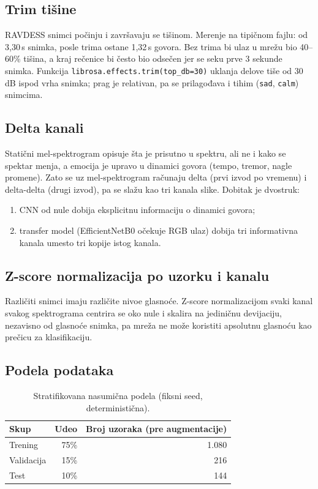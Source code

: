 \documentclass[12pt,a4paper]{article}
\begin{document}
\subsection{Trim tišine}

RAVDESS snimci počinju i završavaju se tišinom. Merenje na tipičnom fajlu:
od 3,30\,s snimka, posle trima ostane 1,32\,s govora. Bez trima bi ulaz u
mrežu bio 40--60\% tišina, a kraj rečenice bi često bio odsečen jer se seku
prve 3 sekunde snimka. Funkcija \texttt{librosa.effects.trim(top\_db=30)}
uklanja delove tiše od 30\,dB ispod vrha snimka; prag je relativan, pa se
prilagođava i tihim (\texttt{sad}, \texttt{calm}) snimcima.

\subsection{Delta kanali}

Statični mel-spektrogram opisuje šta je prisutno u spektru, ali ne i kako
se spektar menja, a emocija je upravo u dinamici govora (tempo, tremor,
nagle promene). Zato se uz mel-spektrogram računaju delta (prvi izvod po
vremenu) i delta-delta (drugi izvod), pa se slažu kao tri kanala slike.
Dobitak je dvostruk:
\begin{enumerate}
  \item CNN od nule dobija eksplicitnu informaciju o dinamici govora;
  \item transfer model (EfficientNetB0 očekuje RGB ulaz) dobija tri
        informativna kanala umesto tri kopije istog kanala.
\end{enumerate}

\subsection{Z-score normalizacija po uzorku i kanalu}

Različiti snimci imaju različite nivoe glasnoće. Z-score normalizacijom
svaki kanal svakog spektrograma centrira se oko nule i skalira na jediničnu
devijaciju, nezavisno od glasnoće snimka, pa mreža ne može koristiti
apsolutnu glasnoću kao prečicu za klasifikaciju.

\subsection{Podela podataka}

\begin{table}[H]
\centering
\begin{tabular}{lrr}
\toprule
Skup & Udeo & Broj uzoraka (pre augmentacije) \\
\midrule
Trening    & 75\% & 1.080 \\
Validacija & 15\% & 216 \\
Test       & 10\% & 144 \\
\bottomrule
\end{tabular}
\caption{Stratifikovana nasumična podela (fiksni seed, deterministična).}
\end{table}
\end{document}
